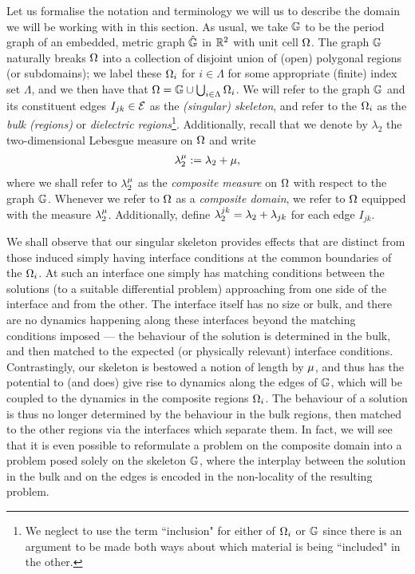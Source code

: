 Let us formalise the notation and terminology we will us to describe the domain we will be working with in this section.
As usual, we take $\mathbb{G}$ to be the period graph of an embedded, metric graph $\hat{\mathbb{G}}$ in $\mathbb{R}^2$ with unit cell $\Omega$.
The graph $\mathbb{G}$ naturally breaks $\Omega$ into a collection of disjoint union of (open) polygonal regions (or subdomains); we label these $\Omega_i$ for $i\in\Lambda$ for some appropriate (finite) index set $\Lambda$, and we then have that $\Omega = \mathbb{G}\cup\bigcup_{i\in\Lambda}\Omega_i$.
We will refer to the graph $\mathbb{G}$ and its constituent edges $I_{jk}\in\mathcal{E}$ as the \emph{(singular) skeleton}, and refer to the $\Omega_i$ as the \emph{bulk (regions)} or \emph{dielectric regions}\footnote{We neglect to use the term ``inclusion" for either of $\Omega_i$ or $\mathbb{G}$ since there is an argument to be made both ways about which material is being ``included" in the other.}.
Additionally, recall that we denote by $\lambda_2$ the two-dimensional Lebesgue measure on $\Omega$ and write
\begin{align*}
	\lambda_2^{\mu} := \lambda_2 + \mu,
\end{align*}
where we shall refer to $\lambda_2^{\mu}$ as the \emph{composite measure} on $\Omega$ with respect to the graph $\mathbb{G}$.
Whenever we refer to $\Omega$ as a \emph{composite domain}, we refer to $\Omega$ equipped with the measure $\lambda_2^{\mu}$.
Additionally, define $\lambda_2^{jk} = \lambda_2 + \lambda_{jk}$ for each edge $I_{jk}$.

We shall observe that our singular skeleton provides effects that are distinct from those induced simply having interface conditions at the common boundaries of the $\Omega_i$.
At such an interface one simply has matching conditions between the solutions (to a suitable differential problem) approaching from one side of the interface and from the other.
The interface itself has no size or bulk, and there are no dynamics happening along these interfaces beyond the matching conditions imposed --- the behaviour of the solution is determined in the bulk, and then matched to the expected (or physically relevant) interface conditions.
Contrastingly, our skeleton is bestowed a notion of length by $\mu$, and thus has the potential to (and does) give rise to dynamics along the edges of $\mathbb{G}$, which will be coupled to the dynamics in the composite regions $\Omega_i$.
The behaviour of a solution is thus no longer determined by the behaviour in the bulk regions, then matched to the other regions via the interfaces which separate them.
In fact, we will see that it is even possible to reformulate a problem on the composite domain into a problem posed solely on the skeleton $\mathbb{G}$, where the interplay between the solution in the bulk and on the edges is encoded in the non-locality of the resulting problem.

